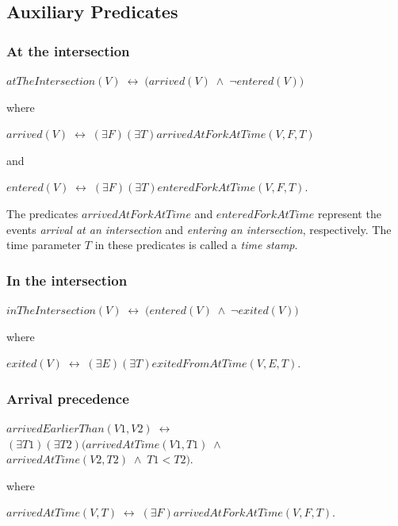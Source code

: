 \subsection{Auxiliary Predicates}

\subsubsection{At the intersection}
\begin{center}
    $ atTheIntersection(V) \; \leftrightarrow \; \Big(  arrived(V) \; \land \; \neg entered(V) \Big) $
\end{center}
where
\begin{center}
    $ arrived(V) \; \leftrightarrow \; (\exists F)(\exists T) arrivedAtForkAtTime(V, F, T) $
\end{center}
and
\begin{center}
    $ entered(V) \; \leftrightarrow \; (\exists F)(\exists T) enteredForkAtTime(V, F, T) $.
\end{center}
The predicates $arrivedAtForkAtTime$ and $enteredForkAtTime$
represent the events
\emph{arrival at an intersection} and
\emph{entering an intersection}, respectively.
The time parameter $T$ in these predicates
is called a \emph{time stamp}.

\subsubsection{In the intersection}
\begin{center}
    $ inTheIntersection(V) \; \leftrightarrow \; \Big(  entered(V) \; \land \; \neg exited(V) \Big) $
\end{center}
where
\begin{center}
    $ exited(V) \; \leftrightarrow \; (\exists E)(\exists T) exitedFromAtTime(V, E, T) $.
\end{center}

\subsubsection{Arrival precedence}
\begin{center}
    $ arrivedEarlierThan(V1, V2) \; \leftrightarrow $ \\
    $ (\exists T1)(\exists T2) \Big( arrivedAtTime(V1, T1) \; \land $ \\
    $ arrivedAtTime(V2, T2) \; \land \; T1 < T2 \Big).$
\end{center}
where
\begin{center}
    $ arrivedAtTime(V, T) \; \leftrightarrow \; (\exists F) arrivedAtForkAtTime(V, F, T) $.
\end{center}

